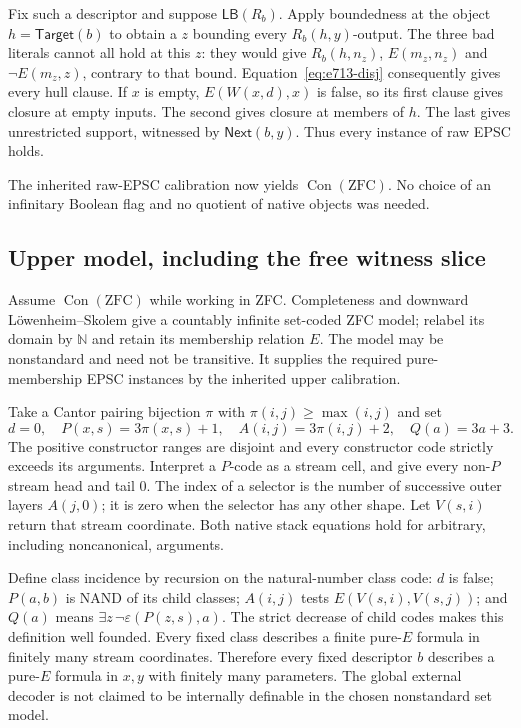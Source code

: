 Fix such a descriptor and suppose $\mathsf{LB}(R_b)$. Apply boundedness
at the object $h=\mathsf{Target}(b)$ to obtain a $z$ bounding every
$R_b(h,y)$-output. The three bad literals cannot all hold at this $z$:
they would give $R_b(h,n_z)$, $E(m_z,n_z)$ and $\neg E(m_z,z)$, contrary
to that bound. Equation~\eqref{eq:e713-disj} consequently gives every
hull clause. If $x$ is empty, $E(W(x,d),x)$ is false, so its first
clause gives closure at empty inputs. The second gives closure at members
of $h$. The last gives unrestricted support, witnessed by
$\mathsf{Next}(b,y)$. Thus every instance of raw EPSC holds.

The inherited raw-EPSC calibration now yields
$\operatorname{Con}(\mathrm{ZFC})$. No choice of an infinitary Boolean
flag and no quotient of native objects was needed.

\subsection{Upper model, including the free witness slice}

Assume $\operatorname{Con}(\mathrm{ZFC})$ while working in ZFC.
Completeness and downward L\"owenheim--Skolem give a countably infinite
set-coded ZFC model; relabel its domain by $\mathbb N$ and retain its
membership relation $E$. The model may be nonstandard and need not be
transitive. It supplies the required pure-membership EPSC instances by
the inherited upper calibration.

Take a Cantor pairing bijection $\pi$ with
$\pi(i,j)\geq\max(i,j)$ and set
\[
 d=0,\quad P(x,s)=3\pi(x,s)+1,\quad A(i,j)=3\pi(i,j)+2,
 \quad Q(a)=3a+3.
\]
The positive constructor ranges are disjoint and every constructor code
strictly exceeds its arguments. Interpret a $P$-code as a stream cell,
and give every non-$P$ stream head and tail 0. The index of a selector
is the number of successive outer layers $A(j,0)$; it is zero when the
selector has any other shape. Let $V(s,i)$ return that stream coordinate.
Both native stack equations hold for arbitrary, including noncanonical,
arguments.

Define class incidence by recursion on the natural-number class code:
$d$ is false; $P(a,b)$ is NAND of its child classes; $A(i,j)$ tests
$E(V(s,i),V(s,j))$; and $Q(a)$ means
$\exists z\,\neg\varepsilon(P(z,s),a)$. The strict decrease of child
codes makes this definition well founded. Every fixed class describes a
finite pure-$E$ formula in finitely many stream coordinates. Therefore
every fixed descriptor $b$ describes a pure-$E$ formula in $x,y$ with
finitely many parameters. The global external decoder is not claimed to
be internally definable in the chosen nonstandard set model.

